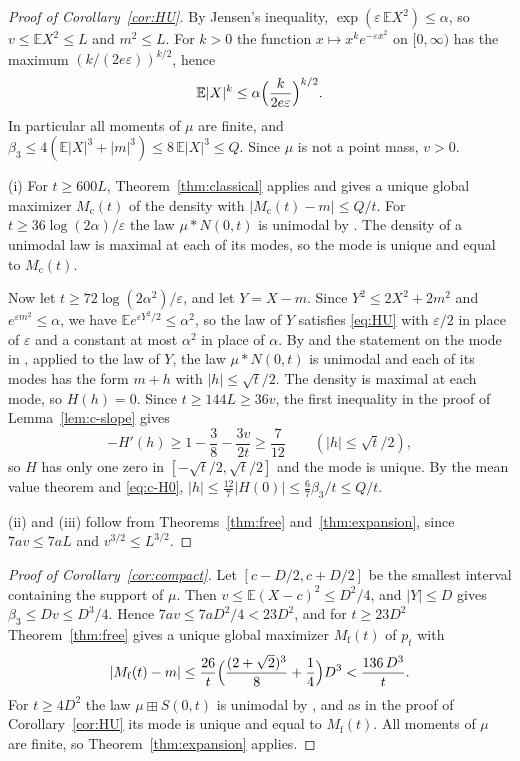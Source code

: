 \documentclass[11pt]{amsart}
\theoremstyle{definition}
\newcommand{\E}{\mathbb{E}}
\newcommand{\Mcl}{M_{\mathrm{c}}}
\newcommand{\Mfr}{M_{\mathrm{f}}}
\begin{document}
\begin{proof}[Proof of Corollary~\ref{cor:HU}]
By Jensen's inequality, $\exp(\varepsilon\,\E X^2)\le\alpha$, so $v\le\E X^2\le L$ and $m^2\le L$. For $k>0$ the
function $x\mapsto x^ke^{-\varepsilon x^2}$ on $[0,\infty)$ has the maximum $(k/(2e\varepsilon))^{k/2}$, hence
\[
\E|X|^k\le\alpha\Bigl(\frac{k}{2e\varepsilon}\Bigr)^{k/2}.
\]
In particular all moments of $\mu$ are finite, and $\beta_3\le4(\E|X|^3+|m|^3)\le8\,\E|X|^3\le Q$. Since $\mu$ is
not a point mass, $v>0$.

(i) For $t\ge600L$, Theorem~\ref{thm:classical} applies and gives a unique global maximizer $\Mcl(t)$ of the density
with $|\Mcl(t)-m|\le Q/t$. For $t\ge36\log(2\alpha)/\varepsilon$ the law $\mu*N(0,t)$ is unimodal
by \cite[Theorem~4.3]{HU}. The density of a unimodal law is maximal at each of its modes, so the mode is unique and
equal to $\Mcl(t)$.

Now let $t\ge72\log(2\alpha^2)/\varepsilon$, and let $Y=X-m$. Since $Y^2\le2X^2+2m^2$ and
$e^{\varepsilon m^2}\le\alpha$, we have $\E e^{\varepsilon Y^2/2}\le\alpha^2$, so the law of $Y$ satisfies
\eqref{eq:HU} with $\varepsilon/2$ in place of $\varepsilon$ and a constant at most $\alpha^2$ in place of $\alpha$.
By \cite[Theorem~4.3]{HU} and the statement on the mode in \cite[Problem~4.6]{HU}, applied to the law of $Y$, the law
$\mu*N(0,t)$ is unimodal and each of its modes has the form $m+h$ with $|h|\le\sqrt t/2$. The density is maximal at
each mode, so $H(h)=0$. Since $t\ge144L\ge36v$, the first inequality in the proof of Lemma~\ref{lem:c-slope} gives
\[
-H'(h)\ge1-\frac38-\frac{3v}{2t}\ge\frac7{12}\qquad(|h|\le\sqrt t/2),
\]
so $H$ has only one zero in $[-\sqrt t/2,\sqrt t/2]$ and the mode is unique. By the mean value theorem
and \eqref{eq:c-H0}, $|h|\le\frac{12}7|H(0)|\le\frac{6}{7}\beta_3/t\le Q/t$.

(ii) and (iii) follow from Theorems~\ref{thm:free} and~\ref{thm:expansion}, since $7av\le7aL$ and
$v^{3/2}\le L^{3/2}$.
\end{proof}

\begin{proof}[Proof of Corollary~\ref{cor:compact}]
Let $[c-D/2,c+D/2]$ be the smallest interval containing the support of $\mu$. Then $v\le\E(X-c)^2\le D^2/4$, and
$|Y|\le D$ gives $\beta_3\le Dv\le D^3/4$. Hence $7av\le7aD^2/4<23D^2$, and for $t\ge23D^2$ Theorem~\ref{thm:free}
gives a unique global maximizer $\Mfr(t)$ of $p_t$ with
\[
|\Mfr(t)-m|\le\frac{26}{t}\Bigl(\frac{(2+\sqrt2)^3}{8}+\frac14\Bigr)D^3<\frac{136\,D^3}{t}.
\]
For $t\ge4D^2$ the law $\mu\boxplus S(0,t)$ is unimodal by \cite[Theorem~3.2]{HU}, and as in the proof of
Corollary~\ref{cor:HU} its mode is unique and equal to $\Mfr(t)$. All moments of $\mu$ are finite, so
Theorem~\ref{thm:expansion} applies.
\end{proof}
\end{document}
